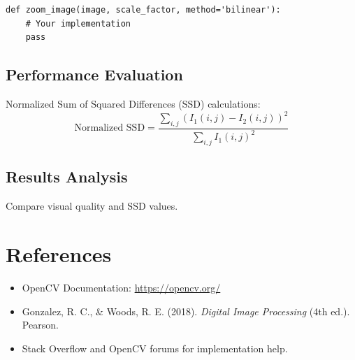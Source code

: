 \documentclass[12pt]{article}
\begin{document}
\begin{lstlisting}
def zoom_image(image, scale_factor, method='bilinear'):
    # Your implementation
    pass
\end{lstlisting}

\subsection{Performance Evaluation}
Normalized Sum of Squared Differences (SSD) calculations:
\[
\text{Normalized SSD} = \frac{\sum_{i,j}(I_1(i,j) - I_2(i,j))^2}{\sum_{i,j}I_1(i,j)^2}
\]

\subsection{Results Analysis}
Compare visual quality and SSD values.

\section{References}
\begin{itemize}
    \item OpenCV Documentation: \url{https://opencv.org/}
    \item Gonzalez, R. C., \& Woods, R. E. (2018). \textit{Digital Image Processing} (4th ed.). Pearson.
    \item Stack Overflow and OpenCV forums for implementation help.
\end{itemize}



% 
% 
\end{document}
